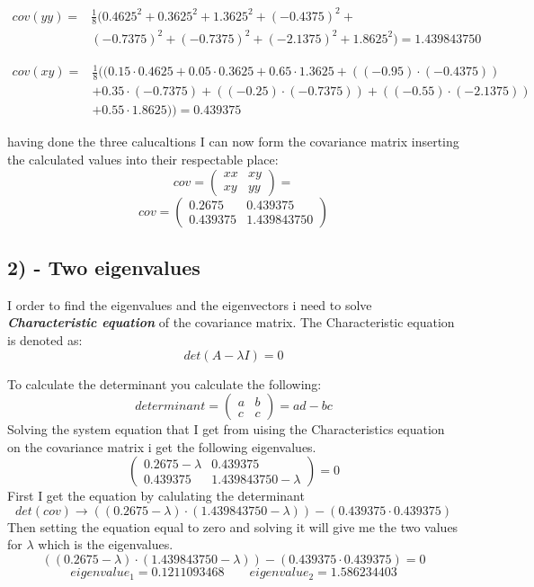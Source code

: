 \begin{equation}
    \begin{split}
        cov(yy) = & \frac{1}{8} \Big(0.4625^2 + 0.3625^2 + 1.3625^2 + (-0.4375)^2 + \\
                  &(-0.7375)^2 + (-0.7375)^2 + (-2.1375)^2 + 1.8625^2 \Big) = 1.439843750
    \end{split}
\end{equation}

\begin{equation}
    \begin{split}
        cov(xy) = & \frac{1}{8} \Big( (0.15\cdot 0.4625 + 0.05 \cdot 0.3625 + 0.65 \cdot  1.3625 + ((-0.95)\cdot (-0.4375))\\
                  &  + 0.35 \cdot (-0.7375) + ((-0.25)\cdot (-0.7375)) + ((-0.55)\cdot (-2.1375))\\
                  &  + 0.55 \cdot 1.8625) \Big) = 0.439375
    \end{split}
\end{equation}

having done the three calucaltions I can now form the covariance matrix inserting the calculated
values into their respectable place:
$$
cov = \begin{pmatrix}
    xx & xy \\
    xy & yy
 \end{pmatrix}
 = 
$$
$$ cov = \begin{pmatrix}
            0.2675 & 0.439375 \\
            0.439375 & 1.439843750
         \end{pmatrix}$$


\subsection{2) - Two eigenvalues}
I order to find the eigenvalues and the eigenvectors i need to solve \textbf{\textit{Characteristic equation}} of the
covariance matrix.
The Characteristic equation is denoted as: 
$$det(A - \lambda I) = 0$$

To calculate the determinant you calculate the following:
$$
determinant = \begin{pmatrix}
                a & b \\
                c & c
              \end{pmatrix}
= ad - bc
$$
Solving the system equation that I get from uising the Characteristics equation on the covariance matrix
i get the following eigenvalues.
$$\begin{pmatrix}
    0.2675 - \lambda & 0.439375 \\
    0.439375 & 1.439843750 - \lambda
\end{pmatrix}
= 0
$$
First I get the equation by calulating the determinant
$$det(cov) \rightarrow ((0.2675 - \lambda) \cdot (1.439843750 - \lambda)) - (0.439375 \cdot 0.439375) $$
Then setting the equation equal to zero and solving it will give me the two values for $\lambda$ which is the
eigenvalues.
$$((0.2675 - \lambda) \cdot (1.439843750 - \lambda)) - (0.439375 \cdot 0.439375) = 0$$
$$eigenvalue_1 = 0.1211093468 \quad \quad eigenvalue_2 = 1.586234403$$


